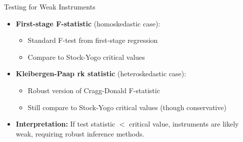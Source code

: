 \documentclass[dvipsnames,hyperref={pdfpagelabels=false}]{beamer}
\begin{document}
\begin{frame}{Testing for Weak Instruments}
	\begin{itemize}
		\item \textbf{First-stage F-statistic} (homoskedastic case):
				\vspace{0.2cm}
		\begin{itemize}
			\item Standard F-test from first-stage regression
					\vspace{0.2cm}
			\item Compare to Stock-Yogo critical values
		\end{itemize}
		\vspace{0.2cm}
		
		\item \textbf{Kleibergen-Paap rk statistic} (heteroskedastic case):
				\vspace{0.2cm}
		\begin{itemize}
			\item Robust version of Cragg-Donald F-statistic
					\vspace{0.2cm}
			\item Still compare to Stock-Yogo critical values (though conservative)
		\end{itemize}
		\vspace{0.2cm}
		
		\item \textbf{Interpretation:} If test statistic $<$ critical value, instruments are likely weak, requiring robust inference methods.
	\end{itemize}
\end{frame}
\end{document}
